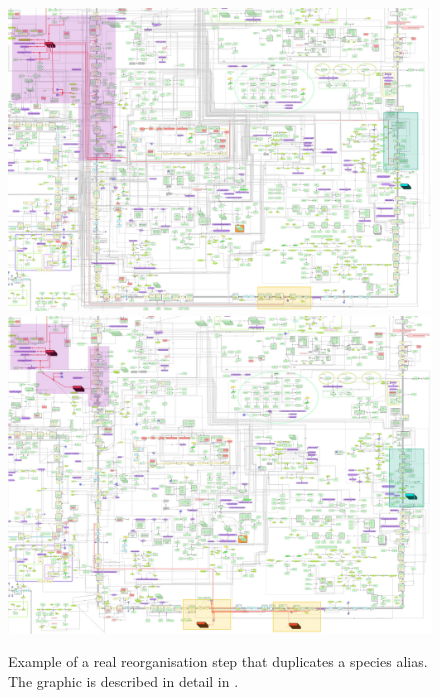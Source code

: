 \documentclass[
	fontsize=10pt, %
	twoside=true, %
	secnumdepth=1, %
  toc=indentunnumbered %
]{kaobook}
\begin{document}
\begin{figure}[h]
  \includegraphics[width=\linewidth]{attachment-examples/s597/202.jpg} \\
  \vspace{1em}
  \includegraphics[width=\linewidth]{attachment-examples/s597/203.jpg}
  \caption{Example of a real reorganisation step that duplicates a species
    alias. The graphic is described in detail in .
  }
  \label{fig:reorg-duplication-example}
\end{figure}
\end{document}
